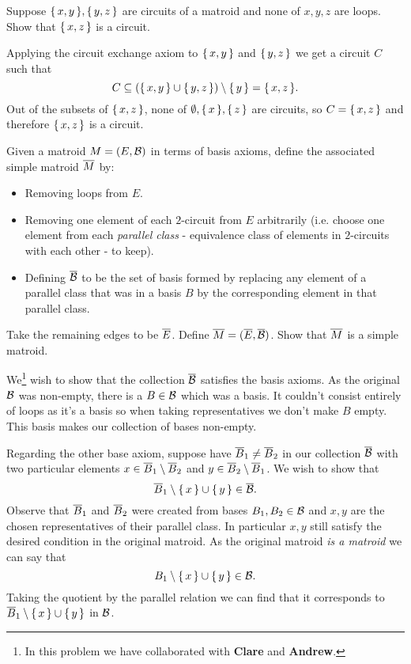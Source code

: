 \documentclass[12pt]{memoir}
\begin{document}
\begin{Ej}[Exercise 5]
   Suppose $\{\,x,y\,\},\{\,y,z\,\}$ are circuits of a matroid and none of $x,y,z$ are loops. Show that $\{\,x,z\,\}$ is a circuit.
\end{Ej}

\begin{ptcbr}
    Applying the circuit exchange axiom to $\{\,x,y\,\}$ and $\{\,y,z\,\}$ we get a circuit $C$ such that 
    $$C\subseteq(\{\,x,y\,\}\cup\{\,y,z\,\})\setminus\{\,y\,\}=\{\,x,z\,\}.$$
    Out of the subsets of $\{\,x,z\,\}$, none of $\emptyset,\{\,x\,\},\{\,z\,\}$ are circuits, so $C=\{\,x,z\,\}$ and therefore $\{\,x,z\,\}$ is a circuit.
\end{ptcbr}

\begin{Ej}[Exercise 6]
    Given a matroid $M=(E,\mathcal{B})$ in terms of basis axioms, define the associated simple matroid $\overline M$ by:
    \begin{itemize}
        \itemsep=-0.4em
        \item Removing loops from $E$.
        \item Removing one element of each $2$-circuit from $E$ arbitrarily (i.e. choose one element from each
        \emph{parallel class} - equivalence class of elements in $2$-circuits with each other - to keep).
        \item Defining $\overline {\mathcal{B}}$ to be the set of basis formed by replacing any element of a parallel class that was in a basis $B$ by the corresponding element in that parallel class.
    \end{itemize}
    Take the remaining edges to be $\overline E$. Define $\overline M=(\overline E,\overline {\mathcal{B}})$. Show that $\overline M$ is a simple matroid. 
\end{Ej}

\begin{ptcbr}
    We\footnote{In this problem we have collaborated with \textbf{Clare} and \textbf{Andrew}.} wish to show that the collection $\overline{\mathcal{B}}$ satisfies the basis axioms. As the original $\mathcal{B}$ was non-empty, there is a $B\in\mathcal{B}$ which was a basis. It couldn't consist entirely of loops as it's a basis so when taking representatives we don't make $B$ empty. This basis makes our collection of bases non-empty.\par
    Regarding the other base axiom, suppose have $\overline B_1\neq \overline B_2$ in our collection $\overline{\mathcal{B}}$ with two particular elements $x\in \overline B_1\setminus \overline B_2$ and $y\in \overline B_2\setminus \overline B_1$. We wish to show that 
    $$\overline B_1\setminus\{\,x\,\}\cup\{\,y\,\}\in\overline{\mathcal{B}}.$$
    Observe that $\overline B_1$ and $\overline B_2$ were created from bases $B_1,B_2\in\mathcal{B}$ and $x,y$ are the chosen representatives of their parallel class. In particular $x,y$ still satisfy the desired condition in the original matroid. As the original matroid \emph{is a matroid} we can say that 
    $$B_1\setminus\{\,x\,\}\cup\{\,y\,\}\in\mathcal{B}.$$
    Taking the quotient by the parallel relation we can find that it corresponds to $\overline B_1\setminus\{\,x\,\}\cup\{\,y\,\}$ in $\mathcal{B}$. 
\end{ptcbr}
\end{document}
